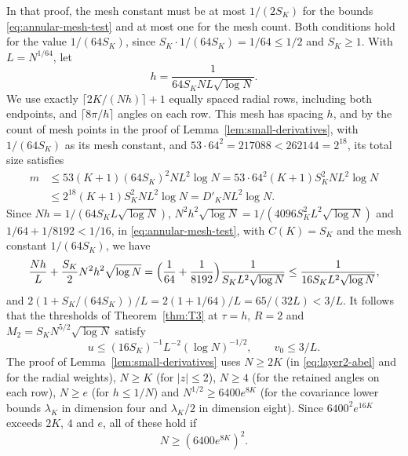 In that proof, the mesh constant must be at most $1/(2S_K)$ for the
bounds \eqref{eq:annular-mesh-test} and at most one for the mesh count. Both conditions hold
for the value $1/(64S_K)$, since $S_K\cdot1/(64S_K)=1/64\le1/2$ and
$S_K\ge1$. With $L=N^{1/64}$, let
\[
 h=\frac1{64S_KNL\sqrt{\log N}}.
\]
We use exactly $\lceil2K/(Nh)\rceil+1$ equally spaced radial rows,
including both endpoints, and $\lceil8\pi/h\rceil$ angles on each row.
This mesh has spacing $h$, and by the count of mesh points in the proof
of Lemma~\ref{lem:small-derivatives}, with $1/(64S_K)$ as its mesh
constant, and $53\cdot64^2=217088<262144=2^{18}$, its total size
satisfies
\begin{align*}
 m&\le53(K+1)(64S_K)^2NL^2\log N=53\cdot64^2(K+1)S_K^2NL^2\log N\\
 &\le2^{18}(K+1)S_K^2NL^2\log N=D'_KNL^2\log N.
\end{align*}
Since $Nh=1/(64S_KL\sqrt{\log N})$,
$N^2h^2\sqrt{\log N}=1/(4096S_K^2L^2\sqrt{\log N})$ and
$1/64+1/8192<1/16$, in \eqref{eq:annular-mesh-test}, with
$C(K)=S_K$ and the mesh constant $1/(64S_K)$, we have
\[
 \frac{Nh}L+\frac{S_K}2N^2h^2\sqrt{\log N}
 =\Bigl(\frac1{64}+\frac1{8192}\Bigr)\frac1{S_KL^2\sqrt{\log N}}
 \le\frac1{16S_KL^2\sqrt{\log N}},
\]
and $2(1+S_K/(64S_K))/L=2(1+1/64)/L=65/(32L)<3/L$.
It follows that the thresholds of Theorem~\ref{thm:T3} at $\tau=h$,
$R=2$ and $M_2=S_KN^{5/2}\sqrt{\log N}$ satisfy
\begin{equation}
 u\le(16S_K)^{-1}L^{-2}(\log N)^{-1/2},
 \qquad v_0\le3/L.
 \label{eq:layer2-meshtest}
\end{equation}
The proof of Lemma~\ref{lem:small-derivatives} uses $N\ge2K$ (in
\eqref{eq:layer2-abel} and for the radial weights), $N\ge K$ (for
$|z|\le2$), $N\ge4$ (for the retained angles on each row), $N\ge e$ (for
$h\le1/N$) and $N^{1/2}\ge6400e^{8K}$ (for the covariance lower bounds
$\lambda_K$ in dimension four and $\lambda_K/2$ in dimension eight).
Since $6400^2e^{16K}$ exceeds $2K$, $4$ and $e$, all of these hold if
\[
 N\ge(6400e^{8K})^2.
\]

